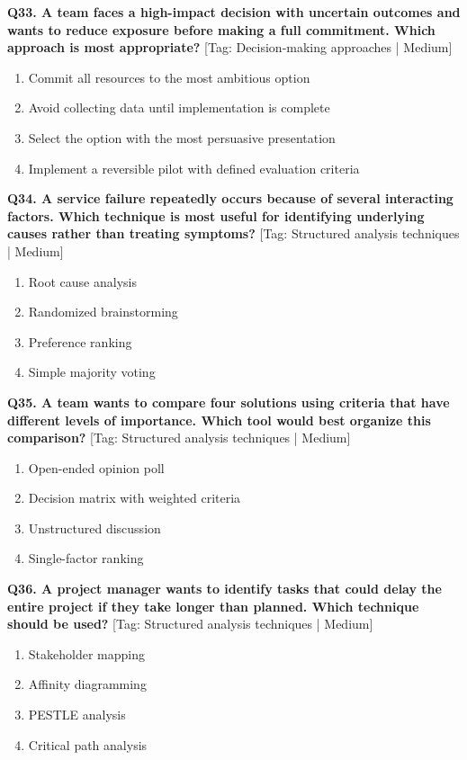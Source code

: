\noindent\textbf{Q33. A team faces a high-impact decision with uncertain outcomes and wants to reduce exposure before making a full commitment. Which approach is most appropriate?} \hfill [Tag: Decision-making approaches | Medium]
\begin{enumerate}[label=(\alph*),topsep=2pt,itemsep=1pt,partopsep=0pt,parsep=0pt]
    \item {Commit all resources to the most ambitious option}
    \item {Avoid collecting data until implementation is complete}
    \item {Select the option with the most persuasive presentation}
    \item {Implement a reversible pilot with defined evaluation criteria}
\end{enumerate}
\vspace{2mm}

\noindent\textbf{Q34. A service failure repeatedly occurs because of several interacting factors. Which technique is most useful for identifying underlying causes rather than treating symptoms?} \hfill [Tag: Structured analysis techniques | Medium]
\begin{enumerate}[label=(\alph*),topsep=2pt,itemsep=1pt,partopsep=0pt,parsep=0pt]
    \item {Root cause analysis}
    \item {Randomized brainstorming}
    \item {Preference ranking}
    \item {Simple majority voting}
\end{enumerate}
\vspace{2mm}

\noindent\textbf{Q35. A team wants to compare four solutions using criteria that have different levels of importance. Which tool would best organize this comparison?} \hfill [Tag: Structured analysis techniques | Medium]
\begin{enumerate}[label=(\alph*),topsep=2pt,itemsep=1pt,partopsep=0pt,parsep=0pt]
    \item {Open-ended opinion poll}
    \item {Decision matrix with weighted criteria}
    \item {Unstructured discussion}
    \item {Single-factor ranking}
\end{enumerate}
\vspace{2mm}

\noindent\textbf{Q36. A project manager wants to identify tasks that could delay the entire project if they take longer than planned. Which technique should be used?} \hfill [Tag: Structured analysis techniques | Medium]
\begin{enumerate}[label=(\alph*),topsep=2pt,itemsep=1pt,partopsep=0pt,parsep=0pt]
    \item {Stakeholder mapping}
    \item {Affinity diagramming}
    \item {PESTLE analysis}
    \item {Critical path analysis}
\end{enumerate}
\vspace{2mm}

